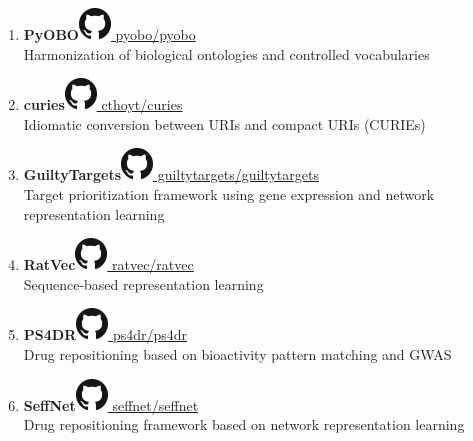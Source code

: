 \documentclass[10pt,a4paper,sans]{moderncv} %
\begin{document}
\begin{enumerate}
        \item \textbf{PyOBO}\hfill\href{https://github.com/pyobo/pyobo}{\includegraphics[scale=0.25]{img/GitHub-Mark-32px} pyobo/pyobo}
\\
    Harmonization of biological ontologies and controlled vocabularies

        \item \textbf{curies}\hfill\href{https://github.com/cthoyt/curies}{\includegraphics[scale=0.25]{img/GitHub-Mark-32px} cthoyt/curies}
\\
    Idiomatic conversion between URIs and compact URIs (CURIEs)

        \item \textbf{GuiltyTargets}\hfill\href{https://github.com/guiltytargets/guiltytargets}{\includegraphics[scale=0.25]{img/GitHub-Mark-32px} guiltytargets/guiltytargets}
\\
    Target prioritization framework using gene expression and network representation learning

        \item \textbf{RatVec}\hfill\href{https://github.com/ratvec/ratvec}{\includegraphics[scale=0.25]{img/GitHub-Mark-32px} ratvec/ratvec}
\\
    Sequence-based representation learning

        \item \textbf{PS4DR}\hfill\href{https://github.com/ps4dr/ps4dr}{\includegraphics[scale=0.25]{img/GitHub-Mark-32px} ps4dr/ps4dr}
\\
    Drug repositioning based on bioactivity pattern matching and GWAS

        \item \textbf{SeffNet}\hfill\href{https://github.com/seffnet/seffnet}{\includegraphics[scale=0.25]{img/GitHub-Mark-32px} seffnet/seffnet}
\\
    Drug repositioning framework based on network representation learning


\end{enumerate}
\end{document}
